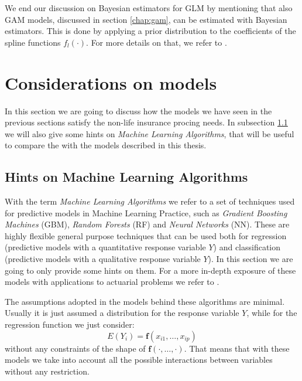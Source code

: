 \documentclass[a4paper, nobind]{templates/ociamthesis}
\theoremstyle{definition}
\theoremstyle{definition}
\theoremstyle{definition}
\theoremstyle{remark}
\begin{document}
We end our discussion on Bayesian estimators for GLM by mentioning that also GAM models, discussed in section \ref{chap:gam}, can be estimated with Bayesian estimators. This is done by applying a prior distribution to the coefficients of the spline functions \(f_l(\cdot)\). For more details on that, we refer to \autocite{bayes-gam}.

\newpage

\hypertarget{chap:considerations-on-models}{%
\section{Considerations on models}\label{chap:considerations-on-models}}

In this section we are going to discuss how the models we have seen in the previous sections satisfy the non-life insurance procing needs. In subsection \ref{chap:ml-techniques} we will also give some hints on \emph{Machine Learning Algorithms}, that will be useful to compare the with the models described in this thesis.

\hypertarget{chap:ml-techniques}{%
\subsection{Hints on Machine Learning Algorithms}\label{chap:ml-techniques}}

With the term \emph{Machine Learning Algorithms} we refer to a set of techniques used for predictive models in Machine Learning Practice, such as \emph{Gradient Boosting Machines} (GBM), \emph{Random Forests} (RF) and \emph{Neural Networks} (NN). These are highly flexible general purpose techniques that can be used both for regression (predictive models with a quantitative response variable \(Y\)) and classification (predictive models with a qualitative response variable \(Y\)). In this section we are going to only provide some hints on them. For a more in-depth exposure of these models with applications to actuarial problems we refer to \autocite{wuthrich-data-analytics}.

The assumptions adopted in the models behind these algorithms are minimal. Usually it is just assumed a distribution for the response variable \(Y\), while for the regression function we just consider:
\[
E(Y_i) = \boldsymbol{f}(x_{i1}, \dots, x_{ip})
\]
without any constraints of the shape of \(\boldsymbol{f}(\cdot,\dots,\cdot)\). That means that with these models we take into account all the possible interactions between variables without any restriction.
\end{document}
